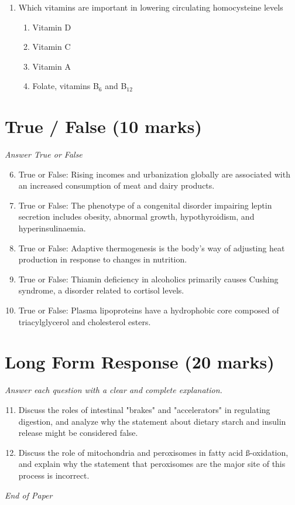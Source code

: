 \documentclass[12pt]{article}
\begin{document}
\begin{enumerate}[label=\arabic*.]
\begin{enumerate}[label=(\alph*)]
    \item Alpha limit dextrins
    \item Sucrose
    \item polysaccharides
\end{enumerate}
\item Which vitamins are important in lowering circulating homocysteine levels
\begin{enumerate}[label=(\alph*)]
    \item Vitamin D
    \item Vitamin C
    \item Vitamin A
    \item Folate, vitamins B$_{6}$ and B$_{12}$
\end{enumerate}
\end{enumerate}

\section*{True / False (10 marks)}
\textit{Answer True or False}
\begin{enumerate}[label=\arabic*.]
\setcounter{enumi}{5}
\item True or False: Rising incomes and urbanization globally are associated with an increased consumption of meat and dairy products.
\item True or False: The phenotype of a congenital disorder impairing leptin secretion includes obesity, abnormal growth, hypothyroidism, and hyperinsulinaemia.
\item True or False: Adaptive thermogenesis is the body's way of adjusting heat production in response to changes in nutrition.
\item True or False: Thiamin deficiency in alcoholics primarily causes Cushing syndrome, a disorder related to cortisol levels.
\item True or False: Plasma lipoproteins have a hydrophobic core composed of triacylglycerol and cholesterol esters.
\end{enumerate}

\section*{Long Form Response (20 marks)}
\textit{Answer each question with a clear and complete explanation.}
\begin{enumerate}[label=\arabic*.]
\setcounter{enumi}{10}
\item Discuss the roles of intestinal "brakes" and "accelerators" in regulating digestion, and analyze why the statement about dietary starch and insulin release might be considered false.
\item Discuss the role of mitochondria and peroxisomes in fatty acid ß-oxidation, and explain why the statement that peroxisomes are the major site of this process is incorrect.
\end{enumerate}

\vfill
\noindent\textit{End of Paper}
\end{document}
